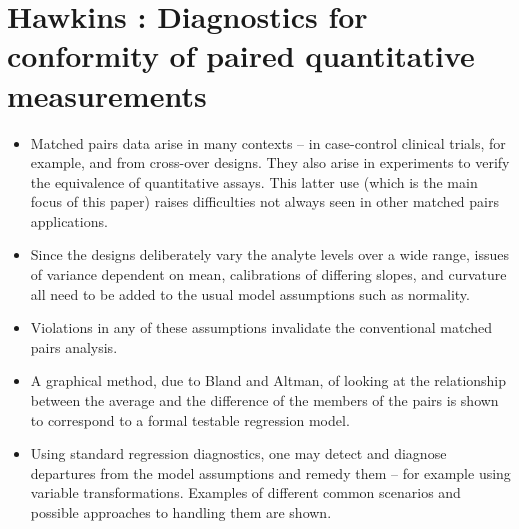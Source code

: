 \documentclass[]{article}
\begin{document}
	
	
	
\section{Hawkins : Diagnostics for conformity of paired quantitative measurements}

\begin{itemize}
	\item Matched pairs data arise in many contexts – in case-control clinical trials, for example, and from cross-over designs. They also arise in experiments to verify the equivalence of quantitative assays. This latter use (which is the main focus of this paper) raises difficulties not always seen in other matched pairs applications. 
	
	\item Since the designs deliberately vary the analyte levels over a wide range, issues of variance dependent on mean, calibrations of differing slopes, and curvature all need to be added to the usual model assumptions such as normality. 
	
	\item Violations in any of these assumptions invalidate the conventional matched pairs analysis. 
	
	\item A graphical method, due to Bland and Altman, of looking at the relationship between the average and the difference of the members of the pairs is shown to correspond to a formal testable regression model. 
	
	\item Using standard regression diagnostics, one may detect and diagnose departures from the model assumptions and remedy them – for example using variable transformations. Examples of different common scenarios and possible approaches to handling them are shown.
\end{itemize}
\end{document}
